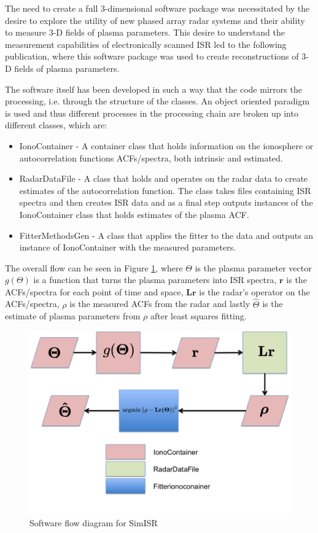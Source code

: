 The need to create a full 3-dimensional software package was necessitated by the desire to explore the utility of new phased array radar systems and their ability to measure 3-D fields of plasma parameters. This desire to understand the measurement capabilities of electronically scanned ISR led to the following publication, \citet{RDS:RDS20236} where this software package was used to create reconstructions of 3-D fields of plasma parameters.

The software itself has been developed in such a way that the code mirrors the processing, i.e. through the structure of the classes. An object oriented paradigm is used and thus different processes in the processing chain are broken up into different classes, which are: 

\begin{itemize} 
\item IonoContainer - A container class that holds information on the ionosphere or autocorrelation functions ACFs/spectra, both intrinsic and estimated.

\item RadarDataFile - A class that holds and operates on the radar data to create estimates of the autocorrelation function. The class takes files containing ISR spectra and then creates ISR data and as a final step outputs instances of the IonoContainer class that holds estimates of the plasma ACF.

\item FitterMethodsGen - A class that applies the fitter to the data and outputs an instance of IonoContainer with the measured parameters. 
\end{itemize}

The overall flow can be seen in Figure \ref{fig:swflow}, where  $\Theta$ is the plasma parameter vector $ g(\Theta)$ is a function that turns the plasma parameters into ISR spectra, $ \mathbf{r}$ is the ACFs/spectra for each point of time and space, $ \mathbf{Lr}$ is the radar's operator on the ACFs/spectra, $ \rho$ is the measured ACFs from the radar and lastly $ \hat{\Theta}$ is the estimate of plasma parameters from $ \rho$ after least squares fitting.

\begin{figure}[h!]
\centering
\includegraphics[width=5.0in]{softwareflowandmath}
\caption{Software flow diagram for SimISR}
\label{fig:swflow}
\end{figure}


